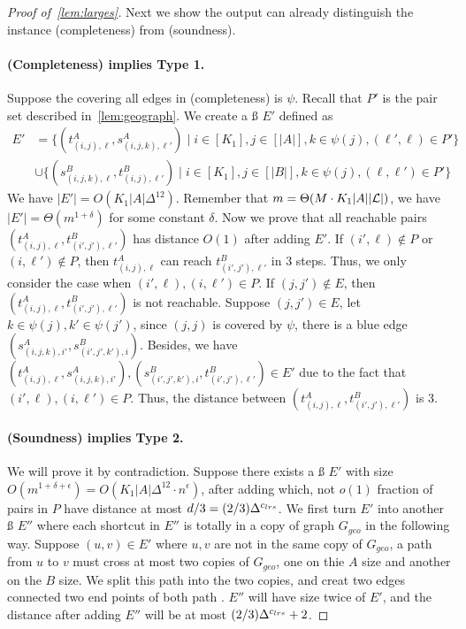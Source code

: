 \begin{proof}[Proof of~\cref{lem:larges}]
	Next we show the output can already distinguish the \labcov{} instance (completeness) from (soundness).
	
	\paragraph{(Completeness) implies Type 1.} %
	Suppose the \mlab{} covering all edges in (completeness) is $\psi$. Recall that $P'$ is the pair set described in~\cref{lem:geograph}. We create a \ss{} $E'$ defined as
	\begin{equation*}
		\begin{aligned}
			E' &= \{(t^A_{(i,j),\ell},s^A_{(i,j,k),\ell'}) \mid i\in[K_1],j\in[|A|],k\in\psi(j),(\ell',\ell)\in P'\} \\
			&\cup \{(s^B_{(i,j,k),\ell},t^B_{(i,j),\ell'}) \mid i\in[K_1],j\in[|B|],k\in\psi(j),(\ell,\ell')\in P'\}
		\end{aligned}
	\end{equation*}
	We have $|E'|=O(K_1|A|\Delta^{12})$. Remember that $m=\Theta(M\cdot K_1|A||\mathcal{L}|)$, we have $|E'|=\Theta(m^{1+\delta})$ for some constant $\delta$. Now we prove that all reachable pairs $(t^A_{(i,j),\ell},t^B_{(i',j'),\ell'})$ has distance $O(1)$ after adding $E'$. If $(i',\ell)\not\in P$ or $(i,\ell')\not\in P$, then $t^A_{(i,j),\ell}$ can reach $t^B_{(i',j'),\ell'}$ in $3$ steps. Thus, we only consider the case when $(i',\ell),(i,\ell')\in P$. If $(j,j')\not\in E$, then $(t^A_{(i,j),\ell},t^B_{(i',j'),\ell'})$ is not reachable. Suppose $(j,j')\in E$, let $k\in\psi(j),k'\in\psi(j')$, since $(j,j)$ is covered by $\psi$, there is a blue edge $(s^A_{(i,j,k),i'},s^B_{(i',j',k'),i})$. Besides, we have $(t^A_{(i,j),\ell},s^A_{(i,j,k),i'}),(s^B_{(i',j',k'),i},t^B_{(i',j'),\ell'})\in E'$ due to the fact that $(i',\ell),(i,\ell')\in P$. Thus, the distance between $(t^A_{(i,j),\ell},t^B_{(i',j'),\ell'})$ is $3$. 
	
	\paragraph{(Soundness) implies Type 2.} We will prove it by contradiction. Suppose there exists a \ss{} $E'$ with size $O(m^{1+\delta+\epsilon})=O(K_1|A|\Delta^{12}\cdot n^\epsilon)$, after adding which, not $o(1)$ fraction of pairs in $P$ have distance at most $d/3=(2/3)\Delta^{{c_{lrs}}{}}$. We first turn $E'$ into another \ss{} $E''$ where each shortcut in $E''$ is totally in a copy of graph $G_{geo}$ in the following way. Suppose $(u,v)\in E'$ where $u,v$ are not in the same copy of $G_{geo}$, a path from $u$ to $v$ must cross at most two copies of $G_{geo}$, one on thie $A$ size and another on the $B$ size. We split this path into the two copies, and creat two edges connected two end points of both path
	. $E''$ will have size twice of $E'$, and the distance after adding $E''$ will be at most $(2/3)\Delta^{{c_{lrs}}{}}+2$.
	

\end{proof}
